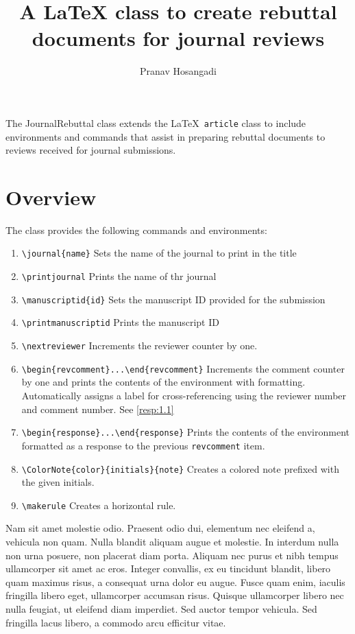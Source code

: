 \documentclass[12pt]{journalrebuttal}
\title{A LaTeX class to create rebuttal documents for journal reviews}
\author{Pranav Hosangadi}
\begin{document}
\maketitle

The JournalRebuttal class extends the \LaTeX~\verb|article| class to include environments and commands that assist in preparing rebuttal documents to reviews received for journal submissions. 

\vspace{0.5cm}
\makerule
\section*{Overview}
The class provides the following commands and environments:

\begin{enumerate}
    \item \verb|\journal{name}| Sets the name of the journal to print in the title
    \item \verb|\printjournal| Prints the name of thr journal
    \item \verb|\manuscriptid{id}| Sets the manuscript ID provided for the submission
    \item \verb|\printmanuscriptid| Prints the manuscript ID
    \item \verb|\nextreviewer| Increments the reviewer counter by one. 
    \item \verb|\begin{revcomment}...\end{revcomment}| Increments the comment counter by one and prints the contents of the environment with formatting. Automatically assigns a label for cross-referencing using the reviewer number and comment number. See \cref{resp:1.1}
    \item \verb|\begin{response}...\end{response}| Prints the contents of the environment formatted as a response to the previous \verb|revcomment| item.
    \item \verb|\ColorNote{color}{initials}{note}| Creates a colored note prefixed with the given initials. 
    \item \verb|\makerule| Creates a horizontal rule.
\end{enumerate}

Nam sit amet molestie odio. Praesent odio dui, elementum nec eleifend a, vehicula non quam. Nulla blandit aliquam augue et molestie. In interdum nulla non urna posuere, non placerat diam porta. Aliquam nec purus et nibh tempus ullamcorper sit amet ac eros. Integer convallis, ex eu tincidunt blandit, libero quam maximus risus, a consequat urna dolor eu augue. Fusce quam enim, iaculis fringilla libero eget, ullamcorper accumsan risus. Quisque ullamcorper libero nec nulla feugiat, ut eleifend diam imperdiet. Sed auctor tempor vehicula. Sed fringilla lacus libero, a commodo arcu efficitur vitae.
\end{document}
